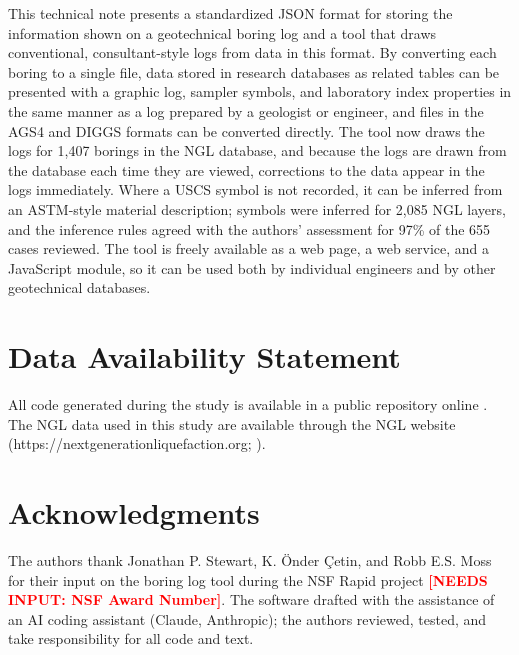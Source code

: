 \documentclass[Journal,letterpaper,InsideFigs]{ascelike-new}
\newcommand{\needsinput}[1]{\textcolor{red}{\textbf{[NEEDS INPUT: #1]}}}
\begin{document}
This technical note presents a standardized JSON format for storing the information shown on a geotechnical boring log and a tool that draws conventional, consultant-style logs from data in this format. By converting each boring to a single file, data stored in research databases as related tables can be presented with a graphic log, sampler symbols, and laboratory index properties in the same manner as a log prepared by a geologist or engineer, and files in the AGS4 and DIGGS formats can be converted directly.  The tool now draws the logs for 1,407 borings in the NGL database, and because the logs are drawn from the database each time they are viewed, corrections to the data appear in the logs immediately. Where a USCS symbol is not recorded, it can be inferred from an ASTM-style material description; symbols were inferred for 2,085 NGL layers, and the inference rules agreed with the authors' assessment for 97\% of the 655 cases reviewed. The tool is freely available as a web page, a web service, and a JavaScript module, so it can be used both by individual engineers and by other geotechnical databases.

\section{Data Availability Statement}

All code generated during the study is available in a public repository online \cite{BrandenbergSahin2026}. The NGL data used in this study are available through the NGL website (https://nextgenerationliquefaction.org; ).

\section{Acknowledgments}

The authors thank Jonathan P. Stewart, K. \"{O}nder \c{C}etin, and Robb E.S. Moss for their input on the boring log tool during the NSF Rapid project \needsinput{NSF Award Number}. The software  drafted with the assistance of an AI coding assistant (Claude, Anthropic); the authors reviewed, tested, and take responsibility for all code and text.

\newpage

\end{document}
